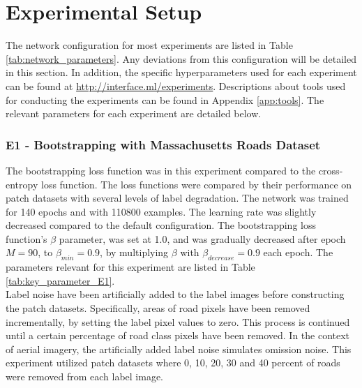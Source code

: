 \section{Experimental Setup}
\label{sec:experimentalSetup}
The network configuration for most experiments are listed in Table \ref{tab:network_parameters}. Any deviations from this configuration will be detailed in this section. In addition, the specific hyperparameters used for each experiment can be found at \url{http://interface.ml/experiments}. Descriptions about tools used for conducting the experiments can be found in Appendix \ref{app:tools}. The relevant parameters for each experiment are detailed below.\\ 

\subsubsection{E1 - Bootstrapping with Massachusetts Roads Dataset}
The bootstrapping loss function was in this experiment compared to the cross-entropy loss function. The loss functions were compared by their performance on patch datasets with several levels of label degradation. The network was trained for 140 epochs and with 110800 examples. The learning rate was slightly decreased compared to the default configuration. The bootstrapping loss function's $\beta$ parameter, was set at 1.0, and was gradually decreased after epoch $M =90$, to $\beta_{min} = 0.9$, by multiplying $\beta$ with $\beta_{decrease}=0.9$ each epoch. The parameters relevant for this experiment are listed in Table \ref{tab:key_parameter_E1}.\\

Label noise have been artificially added to the label images before constructing the patch datasets. Specifically, areas of road pixels have been removed incrementally, by setting the label pixel values to zero. This process is continued until a certain percentage of road class pixels have been removed. In the context of aerial imagery, the artificially added label noise simulates omission noise. This experiment utilized patch datasets where 0, 10, 20, 30 and 40 percent of roads were removed from each label image.\\ 

